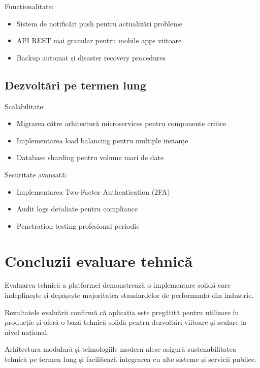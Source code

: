 \documentclass[12pt,a4paper]{report}
\begin{document}
Funcționalitate:
\begin{itemize}
\item Sistem de notificări push pentru actualizări probleme
\item API REST mai granular pentru mobile apps viitoare
\item Backup automat și disaster recovery procedures
\end{itemize}

\subsection{Dezvoltări pe termen lung}

Scalabilitate:
\begin{itemize}
\item Migrarea către arhitectură microservices pentru componente critice
\item Implementarea load balancing pentru multiple instanțe
\item Database sharding pentru volume mari de date
\end{itemize}

Securitate avansată:
\begin{itemize}
\item Implementarea Two-Factor Authentication (2FA)
\item Audit logs detaliate pentru compliance
\item Penetration testing profesional periodic
\end{itemize}

\section{Concluzii evaluare tehnică}

Evaluarea tehnică a platformei  demonstrează o implementare solidă care îndeplinește și depășește majoritatea standardelor de performanță din industrie.

Rezultatele evaluării confirmă că aplicația este pregătită pentru utilizare în producție și oferă o bază tehnică solidă pentru dezvoltări viitoare și scalare la nivel național.

Arhitectura modulară și tehnologiile modern alese   asigură sustenabilitatea tehnică pe termen lung și facilitează integrarea cu alte sisteme și servicii publice.

\newpage
\end{document}
